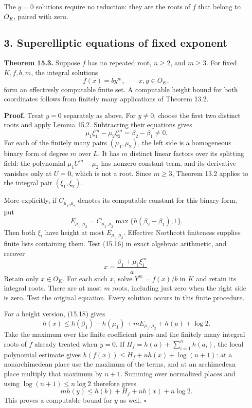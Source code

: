 \documentclass[
  11pt,
  a4paper,
]{article}
\begin{document}
The \(y=0\) solutions require no reduction: they are the roots of \(f\)
that belong to \(O_K\), paired with zero.

\subsection{3. Superelliptic equations of fixed
exponent}\label{superelliptic-equations-of-fixed-exponent}

\textbf{Theorem 15.3.} Suppose \(f\) has no repeated root, \(n\ge2\),
and \(m\ge3\). For fixed \(K,f,b,m\), the integral solutions \[
f(x)=by^m,\qquad x,y\in O_K,
\tag{15.15}
\] form an effectively computable finite set. A computable height bound
for both coordinates follows from finitely many applications of Theorem
13.2.

\textbf{Proof.} Treat \(y=0\) separately as above. For \(y\ne0\), choose
the first two distinct roots and apply Lemma 15.2. Subtracting their
equations gives \[
\mu_1\xi_1^m-\mu_2\xi_2^m=\beta_2-\beta_1\ne0.
\tag{15.16}
\] For each of the finitely many pairs \((\mu_1,\mu_2)\), the left side
is a homogeneous binary form of degree \(m\) over \(L\). It has \(m\)
distinct linear factors over its splitting field: the polynomial
\(\mu_1U^m-\mu_2\) has nonzero constant term, and its derivative
vanishes only at \(U=0\), which is not a root. Since \(m\ge3\), Theorem
13.2 applies to the integral pair \((\xi_1,\xi_2)\).

More explicitly, if \(C_{\mu_1,\mu_2}\) denotes its computable constant
for this binary form, put \[
E_{\mu_1,\mu_2}
 =C_{\mu_1,\mu_2}\max\{h(\beta_2-\beta_1),1\}.
\tag{15.17}
\] Then both \(\xi_i\) have height at most \(E_{\mu_1,\mu_2}\).
Effective Northcott finiteness supplies finite lists containing them.
Test (15.16) in exact algebraic arithmetic, and recover \[
x=\frac{\beta_1+\mu_1\xi_1^m}{a}.
\tag{15.18}
\] Retain only \(x\in O_K\). For each such \(x\), solve \(Y^m=f(x)/b\)
in \(K\) and retain its integral roots. There are at most \(m\) roots,
including just zero when the right side is zero. Test the original
equation. Every solution occurs in this finite procedure.

For a height version, (15.18) gives \[
h(x)\le h(\beta_1)+h(\mu_1)+mE_{\mu_1,\mu_2}
                  +h(a)+\log2.
\tag{15.19}
\] Take the maximum over the finite coefficient pairs and the finitely
many integral roots of \(f\) already treated when \(y=0\). If
\(H_f=h(a)+\sum_{i=1}^n h(a_i)\), the local polynomial estimate gives
\(h(f(x))\le H_f+nh(x)+\log(n+1)\): at a nonarchimedean place use the
maximum of the terms, and at an archimedean place multiply that maximum
by \(n+1\). Summing over normalized places and using
\(\log(n+1)\le n\log2\) therefore gives \[
mh(y)\le h(b)+H_f+nh(x)+n\log2.
\tag{15.20}
\] This proves a computable bound for \(y\) as well. \(\square\)
\end{document}
